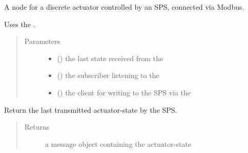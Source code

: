 \documentclass[a4paper,12pt,english]{article}
\begin{document}
\begin{fulllineitems}
\label{\detokenize{meso_control_pkg:meso_control_pkg.sps_discrete_actuator_node.SpsDiscreteActuator}}
A node for a discrete actuator controlled by an SPS, connected via Modbus.

Uses the .
\begin{quote}\begin{description}
\item[{Parameters}] \leavevmode\begin{itemize}
\item {} 
 () \textendash{} the last state received from the 

\item {} 
 () \textendash{} the subscriber listening to the 

\item {} 
 () \textendash{} the client for writing to the SPS via the 

\end{itemize}

\end{description}\end{quote}

\begin{fulllineitems}
\label{\detokenize{meso_control_pkg:meso_control_pkg.sps_discrete_actuator_node.SpsDiscreteActuator.poll_status}}
Return the last transmitted actuator-state by the SPS.
\begin{quote}\begin{description}
\item[{Returns}] \leavevmode
a message object containing the actuator-state


\end{description}
\end{quote}
\end{fulllineitems}
\end{fulllineitems}
\end{document}
